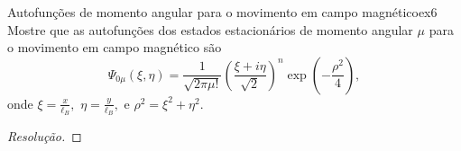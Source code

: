 \begin{exercício}{Autofunções de momento angular para o movimento em campo magnético}{ex6}
    Mostre que as autofunções dos estados estacionários de momento angular \(\mu\) para o movimento em campo magnético são
    \begin{equation*}
       \Psi_{0\mu}(\xi, \eta) = \frac1{\sqrt{2\pi \mu!}}\left(\frac{\xi + i \eta}{\sqrt{2}}\right)^n \exp\left(-\frac{\rho^2}{4}\right),
    \end{equation*}
    onde \(\xi = \frac{x}{\ell_B},\) \(\eta = \frac{y}{\ell_B},\) e \(\rho^2 = \xi^2 + \eta^2.\)
\end{exercício}
\begin{proof}[Resolução]
    
\end{proof}
